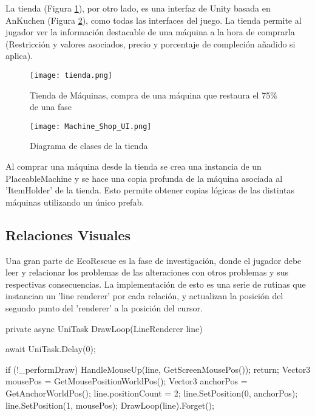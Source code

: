 La tienda (Figura \ref{fig:tienda}), por otro lado, es una interfaz de Unity basada en AnKuchen\cite{AnKuchen} (Figura \ref{fig:tiendaUML}), como todas las interfaces del juego. La tienda permite al jugador ver la información destacable de una máquina a la hora de comprarla (Restricción y valores asociados, precio y porcentaje de compleción añadido si aplica). 

\begin{figure}[H]
\centering
    \texttt{[image: tienda.png]}
\caption{Tienda de Máquinas, compra de una máquina que restaura el 75\% de una fase}
\label{fig:tienda}
\end{figure}

\begin{figure}[H]
\centering
    \texttt{[image: Machine\_Shop\_UI.png]}
\caption{Diagrama de clases de la tienda}
\label{fig:tiendaUML}
\end{figure}

Al comprar una máquina desde la tienda se crea una instancia de un PlaceableMachine y se hace una copia profunda de la máquina asociada al 'ItemHolder' de la tienda. Esto permite obtener copias lógicas de las distintas máquinas utilizando un único prefab.


\subsection{Relaciones Visuales}

Una gran parte de EcoRescue es la fase de investigación, donde el jugador debe leer y relacionar los problemas de las alteraciones con otros problemas y sus respectivas consecuencias. La implementación de esto es una serie de rutinas que instancian un 'line renderer' por cada relación, y actualizan la posición del segundo punto del 'renderer' a la posición del cursor.

\begin{mypython}[caption={Código para dibujar la línea de relaciones.},label={alg:drawloop}]
private async UniTask DrawLoop(LineRenderer line) 
{
    await UniTask.Delay(0);
    
    if (!_performDraw) 
    {
        HandleMouseUp(line, GetScreenMousePos());
        return;
    }
    Vector3 mousePos = GetMousePositionWorldPos();
    Vector3 anchorPos = GetAnchorWorldPos();
    line.positionCount = 2;
    line.SetPosition(0, anchorPos);
    line.SetPosition(1, mousePos);
    DrawLoop(line).Forget();
}
\end{mypython}

